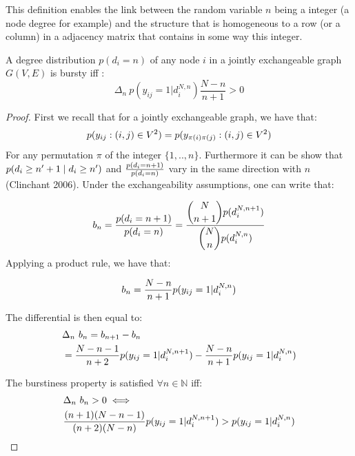 This definition enables the link between the random variable $n$ being a integer (a node degree for example) and the structure that is homogeneous to a row (or a column) in a adjacency matrix that contains in some way this integer.

\begin{theorem} \label{th:burst_exch}
	 A degree distribution $p(d_i=n)$ of any node $i$ in a jointly exchangeable graph $G(V,E)$ is bursty iff :
	\begin{equation}
	 \Delta_n\   p(y_{ij}=1 | d_i^{N,n}) \frac{N-n}{n+1} > 0
	\end{equation}

\end{theorem}

\begin{proof} 	\label{proof:glob}
	First we recall that for a jointly exchangeable graph, we have that:
	\begin{equation*}
	p(y_{ij}: (i,j) \in V^2) = p(y_{\pi(i)\pi(j)}: (i,j) \in V^2)
	\end{equation*}
	For any permutation $\pi$ of the integer $\{1,..,n\}$. Furthermore it can be show that $ p(d_i \geq n'+1 \mid d_i \geq n')$ and $\frac{p(d_i=n+1)}{p(d_i=n)}$ vary in the same direction with $n$ (Clinchant 2006). Under the exchangeability assumptions, one can write that:
	
	\begin{align*}
	 b_n=\frac{p(d_i=n+1)}{p(d_i=n)} = \frac{\dbinom{N}{n+1} p(d_i^{N,n+1})}{\dbinom{N}{n} p(d_i^{N,n})}
	\end{align*}
 Applying a product rule, we have that:
	
	\begin{equation*}
	b_n = \frac{N-n}{n+1} p(y_{ij}=1 | d_i^{N,n})
	\end{equation*}
	
	The differential is then equal to:
	\begin{align*}
	&\Delta_n\  b_n= b_{n+1} - b_n  \\
	&= \frac{N-n-1}{n+2} p(y_{ij}=1 | d_i^{N,n+1}) - \frac{N-n}{n+1} p(y_{ij}=1 | d_i^{N,n})
	\end{align*}
	
	The burstiness property is satisfied  $\forall n \in \mathbb{N}$ iff:
	\begin{align*}
	&\Delta_n\  b_n > 0 \iff \\
	& \frac{(n+1)(N-n-1)}{(n+2)(N-n)}p(y_{ij}=1 | d_i^{N,n+1})  > p(y_{ij}=1 | d_i^{N,n})
	\end{align*}
	\label{b-theorem}
\end{proof}

